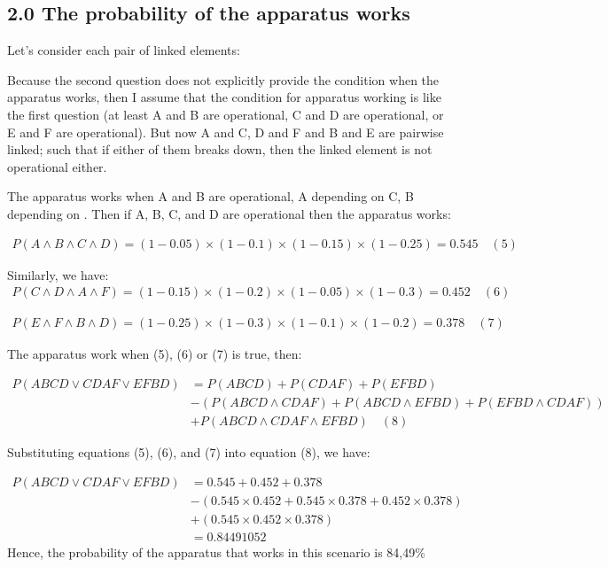 \documentclass{article}
\begin{document}
	\subsection*{\textbf{2.0 The probability of the apparatus works}}
	Let's consider each pair of linked elements:
	
	Because  the second question does not explicitly provide the condition when the apparatus works, then I assume that the condition for apparatus working is like the first question (at least A and B are operational,  C and D are operational, or E and F are operational). But now A and C,  D and F and B and E are pairwise linked; such that if either of them breaks down, then the linked element is not operational either. 
	
	
The apparatus works when A and B are operational,  A depending on C,  B depending on . Then if A, B, C,  and D are operational then the apparatus works:
 

\begin{align*}
P(A \land B \land C \land D ) = (1-0.05) \times (1-0.1) \times   (1-0.15) \times (1-0.25) = 0.545 \quad(5)
 \end{align*}
	
Similarly,   we have: 
	\begin{align*}
		P(C \land D  \land A \land F ) = (1-0.15) \times (1-0.2) \times   (1-0.05) \times (1-0.3) = 0.452  \quad (6)		
	 \end{align*}
 
	 \begin{align*}
		P(E \land F  \land B \land D ) = (1-0.25) \times (1-0.3) \times   (1-0.1) \times (1-0.2) = 0.378  \quad (7)
	 \end{align*}
	
	The apparatus  work when (5), (6) or (7) is true,  then:
	
	\begin{align*}
		P(ABCD \lor CDAF \lor EFBD ) &= P(ABCD) + P(CDAF) + P(EFBD)\\ 
													  &- (P(ABCD \land CDAF) +  P(ABCD \land EFBD) + P(EFBD \land CDAF))  \\
													 &+ P(ABCD \land CDAF \land EFBD) \quad (8)
	 \end{align*}
	
	Substituting equations (5), (6), and (7) into equation (8), we have:
	
	\begin{align*}
		P(ABCD \lor CDAF \lor EFBD ) &= 0.545 +  0.452 +  0.378\\ &- (0.545 \times 0.452  + 0.545 \times 0.378 + 0.452  \times  0.378)\\ &+ (0.545 \times 0.452 \times  0.378 )\\ &= 0.84491052
	 \end{align*}
	Hence,  the probability of the apparatus  that works in this scenario is 84,49\%
\end{document}
